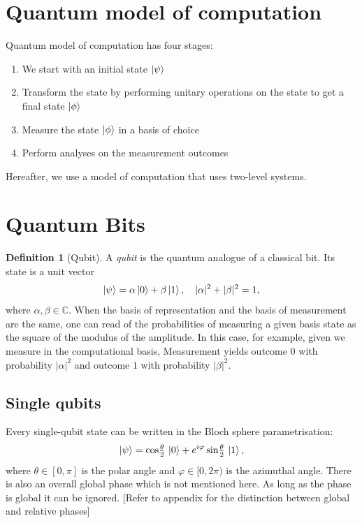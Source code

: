 \documentclass[12pt, a4paper, oneside]{report}
\theoremstyle{plain}
\theoremstyle{definition}
\newtheorem{definition}[theorem]{Definition}
\theoremstyle{remark}
\newcommand{\CC}{\mathbb{C}}
\begin{document}
\section{Quantum model of computation}

Quantum model of computation has four stages:
\begin{enumerate}
    \item We start with an initial state $\ket{\psi}$
    \item Transform the state by performing unitary operations on the state to get a final state $\ket{\phi}$
    \item Measure the state $\ket{\phi}$ in a basis of choice
    \item Perform analyses on the measurement outcomes
\end{enumerate}

Hereafter, we use a model of computation that uses two-level systems.



\section{Quantum Bits}

\begin{definition}[Qubit]
A \emph{qubit} is the quantum analogue of a classical bit. Its state is a unit vector
\[
  \ket{\psi} = \alpha\ket{0} + \beta\ket{1}, \quad |\alpha|^2 + |\beta|^2 = 1,
\]
where $\alpha, \beta \in \CC$. When the basis of representation and the basis of measurement are the same, one can read of the probabilities of measuring a given basis state as the square of the modulus of the amplitude. In this case, for example, given we measure in the computational basis, Measurement yields outcome $0$ with probability $|\alpha|^2$
and outcome $1$ with probability $|\beta|^2$.
\end{definition}

\subsection{Single qubits}
Every single-qubit state can be written in the Bloch sphere parametrisation:
\[
  \ket{\psi} = \cos\!\tfrac{\theta}{2}\,\ket{0} + e^{i\varphi}\sin\!\tfrac{\theta}{2}\,\ket{1},
\]
where $\theta \in [0,\pi]$ is the polar angle and $\varphi \in [0, 2\pi)$ is the azimuthal angle. There is also an overall global phase which is not mentioned here. As long as the phase is global it can be ignored. [Refer to appendix for the distinction between global and relative phases]
\end{document}
